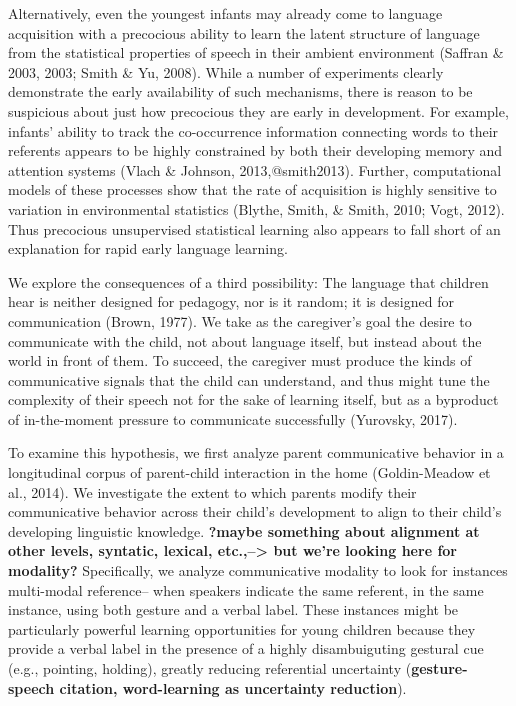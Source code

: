 \documentclass[10pt, letterpaper]{article}
\begin{document}
Alternatively, even the youngest infants may already come to language
acquisition with a precocious ability to learn the latent structure of
language from the statistical properties of speech in their ambient
environment (Saffran \& 2003, 2003; Smith \& Yu, 2008). While a number
of experiments clearly demonstrate the early availability of such
mechanisms, there is reason to be suspicious about just how precocious
they are early in development. For example, infants' ability to track
the co-occurrence information connecting words to their referents
appears to be highly constrained by both their developing memory and
attention systems (Vlach \& Johnson, 2013,@smith2013). Further,
computational models of these processes show that the rate of
acquisition is highly sensitive to variation in environmental statistics
(Blythe, Smith, \& Smith, 2010; Vogt, 2012). Thus precocious
unsupervised statistical learning also appears to fall short of an
explanation for rapid early language learning.

We explore the consequences of a third possibility: The language that
children hear is neither designed for pedagogy, nor is it random; it is
designed for communication (Brown, 1977). We take as the caregiver's
goal the desire to communicate with the child, not about language
itself, but instead about the world in front of them. To succeed, the
caregiver must produce the kinds of communicative signals that the child
can understand, and thus might tune the complexity of their speech not
for the sake of learning itself, but as a byproduct of in-the-moment
pressure to communicate successfully (Yurovsky, 2017).

To examine this hypothesis, we first analyze parent communicative
behavior in a longitudinal corpus of parent-child interaction in the
home (Goldin-Meadow et al., 2014). We investigate the extent to which
parents modify their communicative behavior across their child's
development to align to their child's developing linguistic knowledge.
\textbf{?maybe something about alignment at other levels, syntatic,
lexical, etc.,--\textgreater{} but we're looking here for modality?}
Specifically, we analyze communicative modality to look for instances
multi-modal reference-- when speakers indicate the same referent, in the
same instance, using both gesture and a verbal label. These instances
might be particularly powerful learning opportunities for young children
because they provide a verbal label in the presence of a highly
disambuiguting gestural cue (e.g., pointing, holding), greatly reducing
referential uncertainty (\textbf{gesture-speech citation, word-learning
as uncertainty reduction}).
\end{document}
